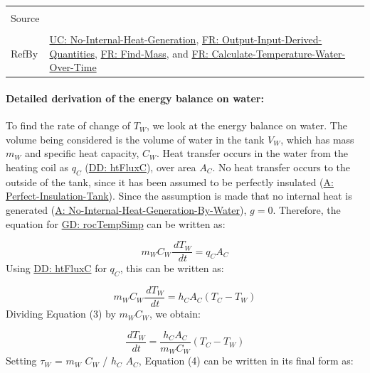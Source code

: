 \documentclass[12pt]{article}
\begin{document}
\begin{minipage}{\textwidth}
\begin{tabular}{>{\raggedright}p{}>{\raggedright\arraybackslash}p{}}
\\ \midrule \\
Source & \cite[(with PCM removed)]{koothoor2013}
         
\\ \midrule \\
RefBy & \hyperref[unlikeChgNIHG]{UC: No-Internal-Heat-Generation}, \hyperref[outputInputDerivQuants]{FR: Output-Input-Derived-Quantities}, \hyperref[findMass]{FR: Find-Mass}, and \hyperref[calcTempWtrOverTime]{FR: Calculate-Temperature-Water-Over-Time}
        
\\ \bottomrule
\end{tabular}
\end{minipage}
\paragraph{Detailed derivation of the energy balance on water:}
\label{IM:eBalanceOnWtrDeriv}
To find the rate of change of ${T_{W}}$, we look at the energy balance on water. The volume being considered is the volume of water in the tank ${V_{W}}$, which has mass ${m_{W}}$ and specific heat capacity, ${C_{W}}$. Heat transfer occurs in the water from the heating coil as ${q_{C}}$ (\hyperref[DD:htFluxC]{DD: htFluxC}), over area ${A_{C}}$. No heat transfer occurs to the outside of the tank, since it has been assumed to be perfectly insulated (\hyperref[assumpPIT]{A: Perfect-Insulation-Tank}). Since the assumption is made that no internal heat is generated (\hyperref[assumpNIHGBW]{A: No-Internal-Heat-Generation-By-Water}), $g=0$. Therefore, the equation for \hyperref[GD:rocTempSimp]{GD: rocTempSimp} can be written as:

\begin{displaymath}
{m_{W}} {C_{W}} \frac{\,d{T_{W}}}{\,dt}={q_{C}} {A_{C}}
\end{displaymath}
Using \hyperref[DD:htFluxC]{DD: htFluxC} for ${q_{C}}$, this can be written as:

\begin{displaymath}
{m_{W}} {C_{W}} \frac{\,d{T_{W}}}{\,dt}={h_{C}} {A_{C}} \left({T_{C}}-{T_{W}}\right)
\end{displaymath}
Dividing Equation (3) by ${m_{W}} {C_{W}}$, we obtain:

\begin{displaymath}
\frac{\,d{T_{W}}}{\,dt}=\frac{{h_{C}} {A_{C}}}{{m_{W}} {C_{W}}} \left({T_{C}}-{T_{W}}\right)
\end{displaymath}
Setting ${τ_{W}}$ = ${m_{W}}$ ${C_{W}}$ / ${h_{C}}$ ${A_{C}}$, Equation (4) can be written in its final form as:
\end{document}
